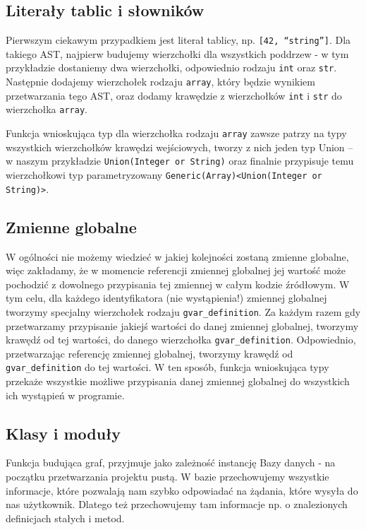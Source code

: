 \documentclass[declaration,shortabstract]{iithesis}
\begin{document}
\subsection{Literały tablic i słowników}

Pierwszym ciekawym przypadkiem jest literał tablicy, np. \texttt{[42, ``string'']}. Dla takiego AST, najpierw budujemy wierzchołki dla wszystkich poddrzew - w tym przykładzie dostaniemy dwa wierzchołki, odpowiednio rodzaju \texttt{int} oraz \texttt{str}. Następnie dodajemy wierzchołek rodzaju \texttt{array}, który będzie wynikiem przetwarzania tego AST, oraz dodamy krawędzie z wierzchołków \texttt{int} i \texttt{str} do wierzchołka \texttt{array}.

Funkcja wnioskująca typ dla wierzchołka rodzaju \texttt{array} zawsze patrzy na typy wszystkich wierzchołków krawędzi wejściowych, tworzy z nich jeden typ Union -- w naszym przykładzie \texttt{Union(Integer or String)} oraz finalnie przypisuje temu wierzchołkowi typ parametryzowany \texttt{Generic(Array)<Union(Integer or String)>}.

\subsection{Zmienne globalne}

W ogólności nie możemy wiedzieć w jakiej kolejności zostaną zmienne globalne, więc zakładamy, że w momencie referencji zmiennej globalnej jej wartość może pochodzić z dowolnego przypisania tej zmiennej w całym kodzie źródłowym. W tym celu, dla każdego identyfikatora (nie wystąpienia!) zmiennej globalnej tworzymy specjalny wierzchołek rodzaju \texttt{gvar\_definition}. Za każdym razem gdy przetwarzamy przypisanie jakiejś wartości do danej zmiennej globalnej, tworzymy krawędź od tej wartości, do danego wierzchołka \texttt{gvar\_definition}. Odpowiednio, przetwarzając referencję zmiennej globalnej, tworzymy krawędź od \texttt{gvar\_definition} do tej wartości. W ten sposób, funkcja wnioskująca typy przekaże wszystkie możliwe przypisania danej zmiennej globalnej do wszystkich ich wystąpień w programie.

\subsection{Klasy i moduły}

Funkcja budująca graf, przyjmuje jako zależność instancję Bazy danych - na początku przetwarzania projektu pustą. W bazie przechowujemy wszystkie informacje, które pozwalają nam szybko odpowiadać na żądania, które wysyła do nas użytkownik. Dlatego też przechowujemy tam informacje np. o znalezionych definicjach stałych i metod.
\end{document}
